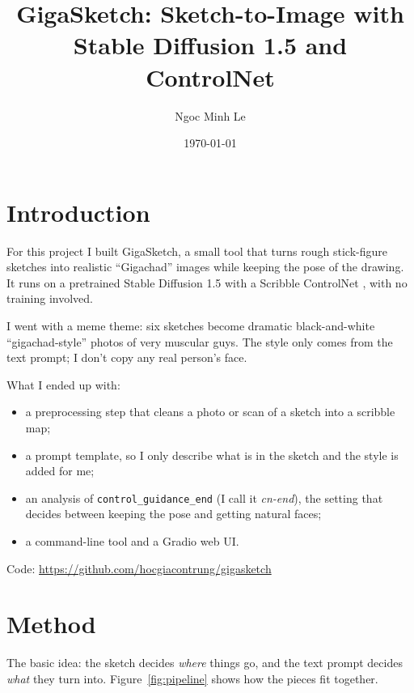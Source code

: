 \documentclass[11pt,a4paper]{article}
\title{GigaSketch: Sketch-to-Image with Stable Diffusion 1.5 and ControlNet}
\author{Ngoc Minh Le}
\date{\today}
\newcommand{\cnend}{\textit{cn-end}}
\begin{document}
\maketitle

\section*{Introduction}

For this project I built GigaSketch, a small tool that turns rough stick-figure sketches into realistic
``Gigachad'' images while keeping the pose of the drawing. It runs on a pretrained Stable Diffusion 1.5
\cite{rombach2022} with a Scribble ControlNet \cite{zhang2023}, with no training involved.

I went with a meme theme: six sketches become dramatic black-and-white ``gigachad-style'' photos of very
muscular guys. The style only comes from the text prompt; I don't copy any real person's face.

What I ended up with:
\begin{itemize}
  \item a preprocessing step that cleans a photo or scan of a sketch into a scribble map;
  \item a prompt template, so I only describe what is in the sketch and the style is added for me;
  \item an analysis of \texttt{control\_guidance\_end} (I call it \cnend), the setting that decides between
        keeping the pose and getting natural faces;
  \item a command-line tool and a Gradio web UI.
\end{itemize}

Code: \url{https://github.com/hocgiacontrung/gigasketch}

\section*{Method}

The basic idea: the sketch decides \emph{where} things go, and the text prompt decides \emph{what} they turn
into. Figure~\ref{fig:pipeline} shows how the pieces fit together.
\end{document}
